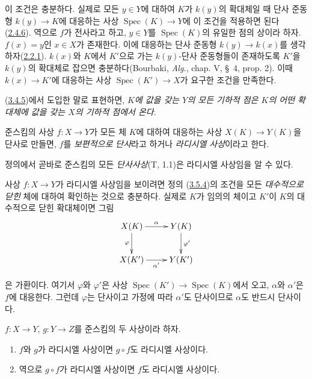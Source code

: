 이 조건은 충분하다. 실제로 모든 $y\in Y$에 대하여 $K$가 $k(y)$의
확대체일 때 단사 준동형 $k(y)\to K$에 대응하는 사상
$\operatorname{Spec}(K)\to Y$에 이 조건을 적용하면 된다
(\hyperref[I.2.4.6-ko]{2.4.6}). 역으로 $f$가 전사라고 하고,
$y\in Y$를 $\operatorname{Spec}(K)$의 유일한 점의 상이라 하자.
$f(x)=y$인 $x\in X$가 존재한다. 이에 대응하는 단사 준동형
$k(y)\to k(x)$를 생각하자(\hyperref[I.2.2.1-ko]{2.2.1}).
$k(x)$와 $K$에서 $K'$으로 가는 $k(y)$-단사 준동형들이 존재하도록
$K'$을 $k(y)$의 확대체로 잡으면 충분하다(Bourbaki, \emph{Alg.},
chap. V, \S~4, prop. 2). 이때 $k(x)\to K'$에 대응하는 사상
$\operatorname{Spec}(K')\to X$가 요구한 조건을 만족한다.

(\hyperref[I.3.4.5-ko]{3.4.5})에서 도입한 말로 표현하면,
\emph{$K$에 값을 갖는 $Y$의 모든 기하적 점은 $K$의 어떤 확대체에
값을 갖는 $X$의 기하적 점에서 온다}.

\begin{definition}[3.5.4]
\label{I.3.5.4-ko}
준스킴의 사상 $f:X\to Y$가 모든 체 $K$에 대하여 대응하는 사상
$X(K)\to Y(K)$을 단사로 만들면, $f$를 \emph{보편적으로 단사}라고
하거나 \emph{라디시엘 사상}이라고 한다.
\end{definition}

정의에서 곧바로 준스킴의 모든 \emph{단사사상}(T, 1.1)은 라디시엘
사상임을 알 수 있다.

\begin{env}[3.5.5]
\label{I.3.5.5-ko}
사상 $f:X\to Y$가 라디시엘 사상임을 보이려면 정의
(\hyperref[I.3.5.4-ko]{3.5.4})의 조건을 모든 \emph{대수적으로
닫힌} 체에 대하여 확인하는 것으로 충분하다. 실제로 $K$가 임의의
체이고 $K'$이 $K$의 대수적으로 닫힌 확대체이면 그림
\label{I.3.5.5.algebraic-closure-diagram-ko}
\[
  \xymatrix{
    X(K)\ar[r]^\alpha\ar[d]_\varphi & Y(K)\ar[d]^{\varphi'}\\
    X(K')\ar[r]_{\alpha'} & Y(K')
  }
\]

은 가환이다. 여기서 $\varphi$와 $\varphi'$은 사상
$\operatorname{Spec}(K')\to\operatorname{Spec}(K)$에서 오고,
$\alpha$와 $\alpha'$은 $f$에 대응한다. 그런데 $\varphi$는 단사이고
가정에 따라 $\alpha'$도 단사이므로 $\alpha$도 반드시 단사이다.
\end{env}

\begin{proposition}[3.5.6]
\label{I.3.5.6-ko}
$f:X\to Y$, $g:Y\to Z$를 준스킴의 두 사상이라 하자.
\begin{enumerate}
  \item[(i)] $f$와 $g$가 라디시엘 사상이면 $g\circ f$도
  라디시엘 사상이다.
  \item[(ii)] 역으로 $g\circ f$가 라디시엘 사상이면 $f$도
  라디시엘 사상이다.
\end{enumerate}
\end{proposition}

